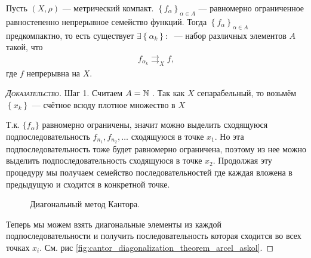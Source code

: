 \documentclass[../complex-analysis.tex]{subfiles}
\begin{document}
 \begin{thm}
  Пусть $ (X,\rho) $ --- метрический компакт.  $ \left\{f_\alpha\right\}_{\alpha \in A}  $ --- равномерно ограниченное равностепенно непрерывное семейство функций. Тогда $ \left\{f_\alpha\right\}_{\alpha \in A} $ предкомпактно, то есть существует $ \exists \left\{\alpha_k\right\} \colon\;  $ --- набор различных элементов $ A $ такой, что
  \begin{align*}
   f_{\alpha_k} \rightrightarrows_X f,
  \end{align*} где $ f $ непрерывна на $ X $.
 \end{thm}
 \begin{proof}[\normalfont\textsc{Доказательство}]
  Шаг 1. Считаем $ A = \mathbb{N} $ . Так как $ X $  сепарабельный, то возьмём $ \left\{x_k\right\}  $ --- счётное всюду плотное множество в $X$

  Т.к. $\{ f_\alpha \}$ равномерно ограничены, значит можно выделить сходящуюся подпоследовательность $f_{n_1}, f_{n_2}, \ldots $ сходящуюся в точке $x_1$.
  Но эта подпоследовательность тоже будет равномерно ограничена, поэтому из нее можно выделить подпоследовательность сходящуюся в точке $x_2$.
  Продолжая эту процедуру мы получаем семейство последовательностей где каждая вложена в предыдущую и сходится в конкретной точке.
  
\begin{figure}[ht]
    \centering
    \caption{Диагональный метод Кантора.}
    \label{fig:cantor_diagonalization_theorem_arcel_askol}
\end{figure}

  Теперь мы можем взять диагональные элементы из каждой подпоследовательности и получить последовательность которая сходится во всех точках $x_i$.
  См. рис \eqref{fig:cantor_diagonalization_theorem_arcel_askol}. 
\end{proof}
\end{document}
